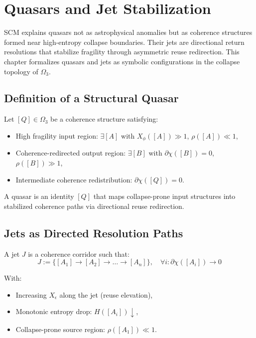 \chapter{Quasars and Jet Stabilization} \label{chapter-quasars}

SCM explains quasars not as astrophysical anomalies but as coherence structures formed near high-entropy collapse boundaries. Their jets are directional return resolutions that stabilize fragility through asymmetric reuse redirection. This chapter formalizes quasars and jets as symbolic configurations in the collapse topology of $\Omega_3$.

\section{Definition of a Structural Quasar} \label{sec:def-quasar}

Let $[Q] \in \Omega_3$ be a coherence structure satisfying:
\begin{itemize}
  \item High fragility input region: $\exists [A]$ with $X_\phi([A]) \gg 1$, $\rho([A]) \ll 1$,
  \item Coherence-redirected output region: $\exists [B]$ with $\partial\chi([B]) = 0$, $\rho([B]) \gg 1$,
  \item Intermediate coherence redistribution: $\partial\chi([Q]) = 0$.
\end{itemize}

\begin{definition}[Quasar]
A quasar is an identity $[Q]$ that maps collapse-prone input structures into stabilized coherence paths via directional reuse redirection.
\end{definition}

\section{Jets as Directed Resolution Paths} \label{sec:jets}

A jet $J$ is a coherence corridor such that:
\[
J := \{ [A_1] \to [A_2] \to \dots \to [A_n] \},\quad \forall i: \partial\chi([A_i]) \to 0
\]

With:
\begin{itemize}
  \item Increasing $X_\epsilon$ along the jet (reuse elevation),
  \item Monotonic entropy drop: $H([A_i]) \downarrow$,
  \item Collapse-prone source region: $\rho([A_1]) \ll 1$.
\end{itemize}

